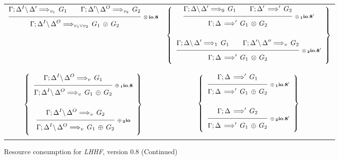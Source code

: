 \begin{figure}[t]
\begin{center}
\begin{tabular}{|c|c|}
      $\ruleII
        {\ioVIII{\G;\D^I}{\D'}{G_1}{v_1}}
        {\ioVIII{\G;\D'}{\D^O}{G_2}{v_2}}
        {\ioVIII{\G;\D^I}{\D^O}{G_1 \Times G_2}{v_1 \vee v_2}}
        {\Times io.8}$
      &
      $\left\{
        \begin{array}{c}
          \ruleII
            {\ioVIII{\G;\D}{\D'}{G_1}{0}}
            {\ioVIIIa{\G;\D'}{G_2}}
            {\ioVIIIa{\G;\D}{G_1 \Times G_2}}
            {\Times_1 io.8'}
        \\ \\
          \ruleII
            {\ioVIII{\G;\D}{\D'}{G_1}{1}}
            {\ioVIII{\G;\D'}{\D''}{G_2}{v}}
            {\ioVIIIa{\G;\D}{G_1 \Times G_2}}
            {\Times_2 io.8'}
        \end{array}
      \right\}$
      \\&\\&\\

      $\left\{
        \begin{array}{c}
          \ruleI
            {\ioVIII{\G;\D^I}{\D^O}{G_1}{v}}
            {\ioVIII{\G;\D^I}{\D^O}{G_1 \Plus G_2}{v}}
            {\Plus_1 io.8}
        \\ \\
          \ruleI
            {\ioVIII{\G;\D^I}{\D^O}{G_2}{v}}
            {\ioVIII{\G;\D^I}{\D^O}{G_1 \Plus G_2}{v}}
            {\Plus_2 io}
        \end{array}
      \right\}$
      &
      $\left\{
        \begin{array}{c}
          \ruleI
            {\ioVIIIa{\G;\D}{G_1}}
            {\ioVIIIa{\G;\D}{G_1 \Plus G_2}}
            {\Plus_1 io.8'}
        \\ \\
          \ruleI
            {\ioVIIIa{\G;\D}{G_2}}
            {\ioVIIIa{\G;\D}{G_1 \Plus G_2}}
            {\Plus_2 io.8'}
        \end{array}
      \right\}$
      \\&\\
      \hline
    \end{tabular}

    \caption{Resource consumption for {\em LHHF}, version 0.8 (Continued)}
    \label{fig:RC_VIII2}
  \end{center}
\end{figure}
\hspace*{1em}




